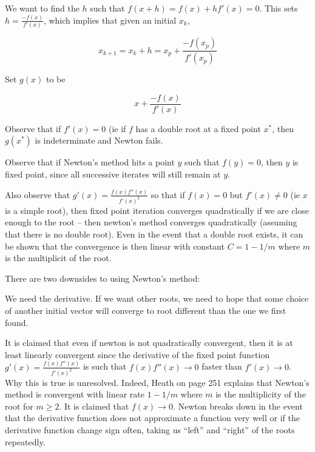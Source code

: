 \documentclass[../main.tex]{subfiles}
\begin{document}
\begin{definition}
    We want to find the $h$ such that $f(x+h) = f(x) + hf'(x) = 0$. This sets $h = \frac{-f(x)}{f'(x)}$, which implies that given an initial $x_k$,

    \[
        x_{k+1} = x_k + h = x_p + \frac{-f(x_p)}{f'(x_p)}
    \]

    Set $g(x)$ to be

    \[
        x + \frac{-f(x)}{f'(x)}
    \]

    Observe that if $f'(x) = 0$ (ie if $f$ has a double root at a fixed point $x^{*}$, then $g(x^{*})$ is indeterminate and Newton fails.

    Observe that if Newton's method hits a point $y$ such that $f(y) = 0$, then $y$ is fixed point, since all successive iterates will still remain at $y$.

    Also observe that $g'(x) = \frac{f(x)f''(x)}{f'(x)^2}$ so that if $f(x) = 0$ but $f'(x) \not = 0$ (ie $x$ is a simple root), then fixed point iteration converges quadratically if we are close enough to the root -- then newton's method converges quadratically (assuming that there is no double root). Even in the event that a double root exists, it can be shown that the convergence is then linear with constant $C = 1 - 1/m$ where $m$ is the multiplicit of the root.
\end{definition}

\begin{remark}
    There are two downsides to using Newton's method:

    \begin{outline}
        \1 We need the derivative.
        \1 If we want other roots, we need to hope that some choice of another initial vector will converge to root different than the one we first found.
    \end{outline}
\end{remark}

\begin{remark}
    It is claimed that even if newton is not quadratically convergent, then it is at least linearly convergent since the derivative of the fixed point function $g'(x) = \frac{f(x)f''(x)}{f'(x)^2}$ is such that $f(x)f''(x) \to 0$ faster than $f'(x) \to 0$. Why this is true is unresolved. Indeed, Heath on page 251 explains that Newton's method is convergent with linear rate $1 - 1/m$ where $m$ is the multiplicity of the root for $m \geq 2$. It is claimed that $f(x) \to 0$. Newton breaks down in the event that the derivative function does not approximate a function very well or if  the derivative function change sign often, taking us ``left'' and ``right'' of the roots repeatedly.
\end{remark}
\end{document}
